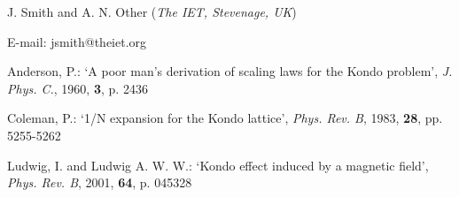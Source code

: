 \documentclass[11pt]{report}
\begin{document}
\vskip5pt

\noindent J. Smith and A. N. Other (\textit{The IET, Stevenage, UK})
\vskip3pt

\noindent E-mail: jsmith@theiet.org

\begin{thebibliography}{}

Anderson, P.: `A poor man's derivation of scaling laws for the Kondo problem', \textit{J. Phys. C.}, 1960, \textbf{3}, p. 2436

Coleman, P.: `1/N expansion for the Kondo lattice', \textit{Phys. Rev. B}, 1983, \textbf{28}, pp. 5255-5262

Ludwig, I. and Ludwig A. W. W.: `Kondo effect induced by a magnetic field', \textit{Phys. Rev. B}, 2001, \textbf{64}, p. 045328

\end{thebibliography}
\end{document}
